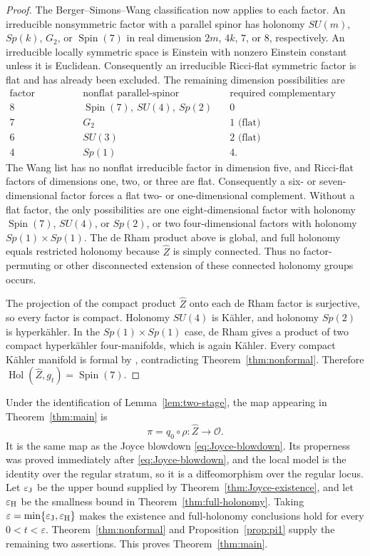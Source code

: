 \documentclass[11pt]{article}
\theoremstyle{remark}\newtheorem{remark}[theorem]{Remark}
\newcommand{\SpinSeven}{\operatorname{Spin}(7)}
\newcommand{\Hol}{\operatorname{Hol}}
\begin{document}
\begin{proof}
The Berger--Simons--Wang classification \cite{Wang} now applies to each
factor.  An irreducible nonsymmetric factor with a parallel spinor has
holonomy $SU(m)$, $Sp(k)$, $G_2$, or $\SpinSeven$ in real dimension $2m$,
$4k$, $7$, or $8$, respectively.  An irreducible locally symmetric space
is Einstein with nonzero Einstein constant unless it is Euclidean.
Consequently an irreducible Ricci-flat symmetric factor is flat and has
already been excluded.  The remaining dimension possibilities are
\[
\begin{array}{c|c|c}
\text{factor dimension}&\text{nonflat parallel-spinor holonomy}
 &\text{required complementary dimension}\\
\hline
8&\SpinSeven,\ SU(4),\ Sp(2)&0\\
7&G_2&1\text{ (flat)}\\
6&SU(3)&2\text{ (flat)}\\
4&Sp(1)&4.
\end{array}
\]
The Wang list has no nonflat irreducible factor in dimension five, and
Ricci-flat factors of dimensions one, two, or three are flat.
Consequently a six- or seven-dimensional factor forces a flat
two- or one-dimensional complement.  Without a flat factor, the only possibilities are
one eight-dimensional factor with holonomy $\SpinSeven$, $SU(4)$, or
$Sp(2)$, or two four-dimensional factors with holonomy
$Sp(1)\times Sp(1)$.  The de Rham product above is global, and full
holonomy equals restricted holonomy because $\widehat Z$ is simply
connected.  Thus no factor-permuting or other disconnected extension of
these connected holonomy groups occurs.

The projection of the compact product $\widehat Z$ onto each de Rham
factor is surjective, so every factor is compact.
Holonomy $SU(4)$ is K\"ahler, and holonomy $Sp(2)$ is hyperk\"ahler.  In
the $Sp(1)\times Sp(1)$ case, de Rham gives a product of two compact
hyperk\"ahler four-manifolds, which is again K\"ahler.  Every compact
K\"ahler manifold is formal by \cite{DGMS}, contradicting
Theorem~\ref{thm:nonformal}.  Therefore
$\Hol(\widehat Z,g_t)=\SpinSeven$.
\end{proof}

Under the identification of Lemma~\ref{lem:two-stage}, the map appearing
in Theorem~\ref{thm:main} is
\[
 \pi=q_0\circ\rho:\widehat Z\longrightarrow\mathcal O.
\]
It is the same map as the Joyce blowdown
\eqref{eq:Joyce-blowdown}.  Its properness was proved immediately after
\eqref{eq:Joyce-blowdown}, and the local model is the identity over the
regular stratum, so it is a diffeomorphism over the regular locus.
Let $\varepsilon_{\rm J}$ be the upper bound supplied by
Theorem~\ref{thm:Joyce-existence}, and let $\varepsilon_{\rm H}$ be the
smallness bound in Theorem~\ref{thm:full-holonomy}.  Taking
$\varepsilon=\min\{\varepsilon_{\rm J},\varepsilon_{\rm H}\}$ makes the
existence and full-holonomy conclusions hold for every
$0<t<\varepsilon$.  Theorem~\ref{thm:nonformal} and
Proposition~\ref{prop:pi1} supply the remaining two assertions.  This
proves Theorem~\ref{thm:main}.
\end{document}
